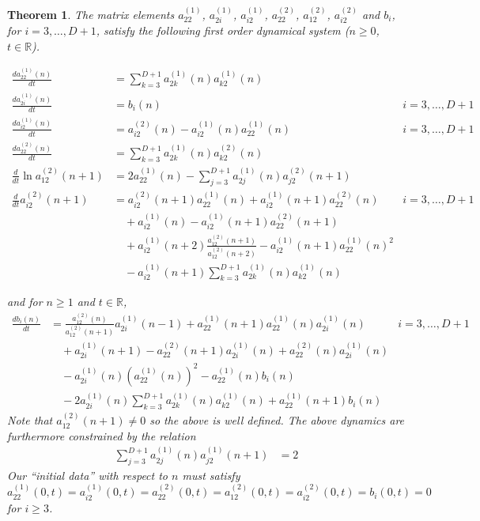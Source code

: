 \documentclass[12pt]{article}
\newtheorem{theorem}{Theorem}[section]
\theoremstyle{definition}
\begin{document}
\begin{theorem}\label{skewtoda} The matrix elements $a^{(1)}_{22}$,  $a^{(1)}_{2i}$, $a^{(1)}_{i2}$,  $a^{(2)}_{22}$,  $a^{(2)}_{12}$,  $a^{(2)}_{i2}$  and $b_i$, for $i=3, \dots, D+1$,  satisfy the following first order dynamical system ($n \geq 0$,  $t \in \mathbb{R}$).
\begin{allowdisplaybreaks}
\begin{align*}
\frac{d a_{22}^{(1)}(n) }{dt} &= \sum_{k=3}^{D+1} a_{2k}^{(1)}(n) a_{k2}^{(1)}(n) \\
\frac{d a_{2i}^{(1)}(n)}{dt} &= b_i(n) & i=3, \dots, D+1 \\
\frac{d a_{i2}^{(1)}(n)}{dt} &= a_{i2}^{(2)}(n) - a_{i2}^{(1)}(n) a_{22}^{(1)}(n)  & i = 3, \dots, D+1 \\
\frac{d a_{22}^{(2)}(n)}{dt} &= \sum_{k=3}^{D+1} a_{2k}^{(1)}(n)a_{k2}^{(2)}(n) \\
 \frac{d}{dt} \ln  a_{12}^{(2)}(n+1) &=2a_{22}^{(1)}(n) -\sum_{j=3}^{D+1} a_{2j}^{(1)}(n)a_{j2}^{(2)}(n+1)  \\
\frac{d}{dt}a_{i2}^{(2)}(n+1)  &=   a_{i2}^{(2)}(n+1) a_{22}^{(1)}(n) + a_{i2}^{(1)}(n+1)a_{22}^{(2)}(n) & i=3, \dots, D+1 \\
&\quad+ a_{i2}^{(1)}(n) - a_{i2}^{(1)}(n+1) a_{22}^{(2)}(n+1)  \\
&\quad +  a_{i2}^{(1)}(n+2)\frac{ a_{12}^{(2)}(n+1)}{a_{12}^{(2)}(n+2)} -  a_{i2}^{(1)}(n+1) a_{22}^{(1)}(n)^2  \\
&\quad - a_{i2}^{(1)}(n+1) \sum_{k=3}^{D+1} a_{2k}^{(1)}(n) a_{k2}^{(1)}(n) 
\end{align*}
\end{allowdisplaybreaks}
and for $n \geq 1$ and $t \in \mathbb{R}$,
\begin{align*}
\frac{d b_i(n)}{dt}  &= \frac{a_{12}^{(2)}(n) }{a_{12}^{(2)}(n+1)}a_{2i}^{(1)}(n-1) + a_{22}^{(1)}(n+1) a_{22}^{(1)}(n) a_{2i}^{(1)}(n)  & i=3, \dots, D+1\\
&\quad+ a_{2i}^{(1)}(n+1)-a_{22}^{(2)}(n+1)a_{2i}^{(1)}(n) + a_{22}^{(2)}(n) a_{2i}^{(1)}(n) \\
&\quad -a_{2i}^{(1)}(n) \left( a_{22}^{(1)}(n) \right)^2  -  a_{22}^{(1)}(n) b_i(n)\\
&\quad - 2 a_{2i}^{(1)}(n) \sum_{k=3}^{D+1}a_{2k}^{(1)}(n) a_{k2}^{(1)}(n) +  a_{22}^{(1)}(n+1) b_i(n)
\end{align*}
Note that $a_{12}^{(2)}(n+1) \neq 0$ so the above is well defined. The above dynamics are furthermore constrained by the relation
\begin{align}\label{identity}
\sum_{j=3}^{D+1} a_{2j}^{(1)}(n) a_{j2}^{(1)}(n+1) &= 2
\end{align}
Our \enquote{initial data} with respect to $n$ must satisfy $a_{22}^{(1)}(0,t) = a_{i2}^{(1)}(0,t) = a_{22}^{(2)}(0,t) = a_{12}^{(2)}(0,t) = a_{i2}^{(2)}(0,t) = b_i(0,t)=0$ for $i \geq 3$.
\end{theorem}
\end{document}
